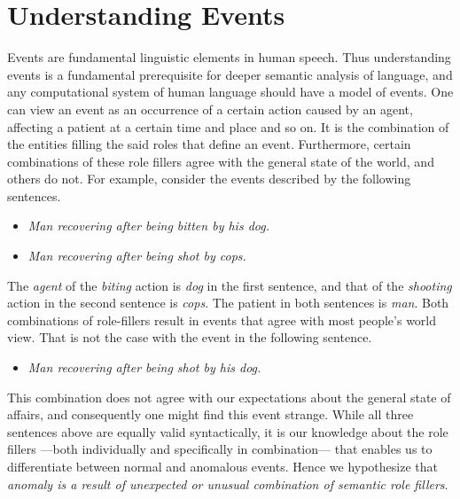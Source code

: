 \section{Understanding Events}
Events are fundamental linguistic elements in human speech. Thus understanding 
events is a fundamental prerequisite for deeper semantic 
analysis of language, and any computational system of human language should
have a model of events. One can view an event as an occurrence of a certain 
action caused
by an agent, affecting a patient at a certain time and place and so on. It is 
the combination of the entities
filling the said roles that define an event. Furthermore, certain combinations 
of these role fillers
agree with the general state of the world, and others do not. For example, 
consider the events described by the following
sentences.
\begin{itemize}
 \item[] \textit{Man recovering after being bitten by his dog.}
 \item[] \textit{Man recovering after being shot by cops.}
\end{itemize}
The \textit{agent} of the \textit{biting} action is \textit{dog} in the first 
sentence, and that of the \textit{shooting}
action in the second sentence is \textit{cops}. The patient in both sentences is 
\textit{man}.
Both combinations of role-fillers result in events that agree with most people's 
world view. That is not the case with
the event in the following sentence.
\begin{itemize}
 \item[] \textit{Man recovering after being shot by his dog.}
\end{itemize}
This combination does not agree with our expectations about the general state of 
affairs, and consequently one
might find this event strange. While all three sentences above are equally
valid syntactically, it 
is our knowledge about the role fillers 
---both individually and specifically in combination---  
that enables us to 
differentiate between normal and anomalous events.  Hence we hypothesize that
\emph{anomaly is a result of unexpected or 
unusual combination of semantic role fillers}.

